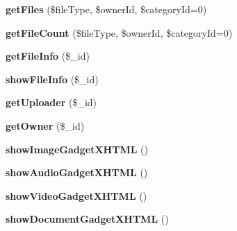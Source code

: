 \begin{CompactItemize}
\item 
{\bf getFiles} (\$fileType, \$ownerId, \$categoryId=0)\label{classFiles_b9edadc78fc933e58a774160d05a86ce}

\item 
{\bf getFileCount} (\$fileType, \$ownerId, \$categoryId=0)\label{classFiles_65d78eb48bf5df0f1db3b754bd5376b8}

\item 
{\bf getFileInfo} (\$\_\-id)\label{classFiles_9e653407e0d4967bdaaadb4da0ef0bf3}

\item 
{\bf showFileInfo} (\$\_\-id)\label{classFiles_d39aa387badb8778c65df4799057b937}

\item 
{\bf getUploader} (\$\_\-id)\label{classFiles_0497189c960e1758660ce3c50aa016d3}

\item 
{\bf getOwner} (\$\_\-id)\label{classFiles_cdc71905661be16eb7ca01e0e08fcc54}

\item 
{\bf showImageGadgetXHTML} ()\label{classFiles_f8f5c97b64d2130cb9a003b2590d4590}

\item 
{\bf showAudioGadgetXHTML} ()\label{classFiles_532a3d5292383287fa17a51765c87a65}

\item 
{\bf showVideoGadgetXHTML} ()\label{classFiles_d1a616fa583f35e4838cd46bc9f614b5}

\item 
{\bf showDocumentGadgetXHTML} ()\label{classFiles_3ae8e08c17ba9d58a832223b572ed3e2}

\end{CompactItemize}
